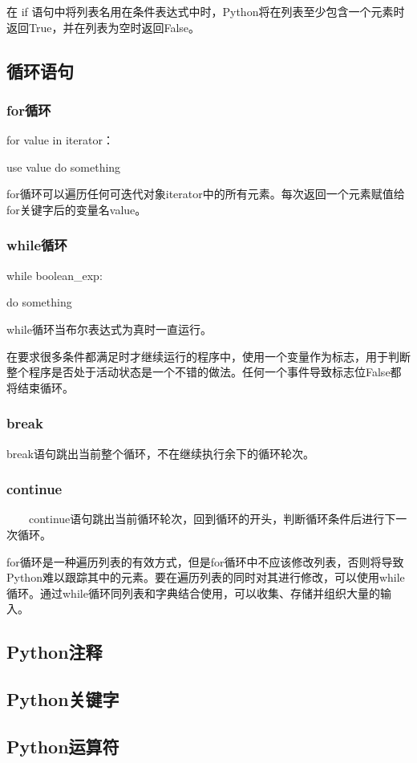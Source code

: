 \documentclass{book}
\begin{document}
\begin{CJK}{UTF8}{gbsn}
在 if 语句中将列表名用在条件表达式中时，Python将在列表至少包含一个元素时返回True，并在列表为空时返回False。


\subsection{循环语句}
\subsubsection{for循环}
for value in iterator：

	use value do something
	
for循环可以遍历任何可迭代对象iterator中的所有元素。每次返回一个元素赋值给for关键字后的变量名value。
\subsubsection{while循环}
while boolean\_exp:

	do something
	
while循环当布尔表达式为真时一直运行。

在要求很多条件都满足时才继续运行的程序中，使用一个变量作为标志，用于判断整个程序是否处于活动状态是一个不错的做法。任何一个事件导致标志位False都将结束循环。
\subsubsection{break}

break语句跳出当前整个循环，不在继续执行余下的循环轮次。
\subsubsection{continue}
\ \ \ \ continue语句跳出当前循环轮次，回到循环的开头，判断循环条件后进行下一次循环。

for循环是一种遍历列表的有效方式，但是for循环中不应该修改列表，否则将导致Python难以跟踪其中的元素。要在遍历列表的同时对其进行修改，可以使用while循环。通过while循环同列表和字典结合使用，可以收集、存储并组织大量的输入。


\subsection{Python注释}
\subsection{Python关键字}
\subsection{Python运算符}




\end{CJK}
\end{document}
